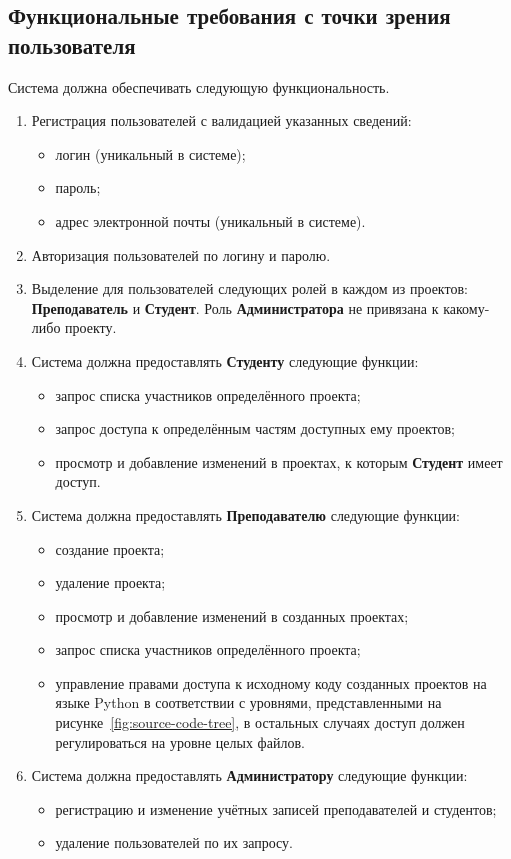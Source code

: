 \documentclass{bmstu}
\begin{document}
  \subsection{Функциональные требования с точки зрения пользователя}

  Система должна обеспечивать следующую функциональность.
  \begin{enumerate}[label*=\arabic*.]
    \item Регистрация пользователей с валидацией указанных
      сведений:
      \begin{itemize}[label=---]
        \item логин (уникальный в системе);
        \item пароль;
        \item адрес электронной почты (уникальный в системе).
      \end{itemize}
    \item Авторизация пользователей по логину и паролю.
    \item Выделение для пользователей следующих ролей в каждом из проектов:
      \textbf{Преподаватель} и \textbf{Студент}.
      Роль \textbf{Администратора} не привязана к какому-либо проекту.
    \item Система должна предоставлять \textbf{Студенту} следующие функции:
    \begin{itemize}[label=---]
    	\item запрос списка участников определённого проекта;
    	\item запрос доступа к определённым частям доступных ему проектов;
    	\item просмотр и добавление изменений в проектах, к которым
    	  \textbf{Студент} имеет доступ.
    \end{itemize}
    \item Система должна предоставлять \textbf{Преподавателю} следующие
      функции:
    \begin{itemize}[label=---]
    	\item создание проекта;
    	\item удаление проекта;
    	\item просмотр и добавление изменений в созданных проектах;
    	\item запрос списка участников определённого проекта;
    	\item управление правами доступа к исходному коду созданных проектов на
    	  языке Python в соответствии с уровнями, представленными на
    	  рисунке~\ref{fig:source-code-tree}, в остальных случаях доступ должен
    	  регулироваться на уровне целых файлов.
    \end{itemize}
    \item Система должна предоставлять \textbf{Администратору} следующие
      функции:
    \begin{itemize}[label=---]
    	\item регистрацию и изменение учётных записей преподавателей и студентов;
    	\item удаление пользователей по их запросу.
    \end{itemize}
  \end{enumerate}
\end{document}
